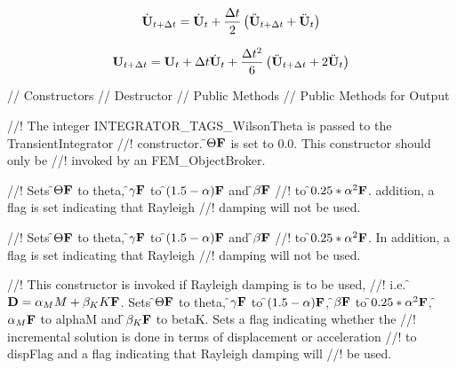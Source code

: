 \[ \dot{\bf U}_{t + \Delta t} = \dot{\bf U}_t + \frac{\Delta t}{2}\left( \ddot{\bf U}_{t +
\Delta t} + \ddot{\bf U}_t \right) \]

\[ {\bf U}_{t + \Delta t} = {\bf U}_t + \Delta t\dot{\bf U}_t + \frac{\Delta t^2}{6}\left(
\ddot{\bf U}_{t + \Delta t} + 2 \ddot{\bf U}_t \right) \]


\pagebreak
{}
\indent // Constructors
\indent // Destructor
\indent // Public Methods
\indent // Public Methods for Output

//! The integer INTEGRATOR\_TAGS\_WilsonTheta is passed to the TransientIntegrator
//! constructor. \f$\Theta{\bf F}$ is set to 0.0. This constructor should only be
//! invoked by an FEM\_ObjectBroker.



//! Sets \f$\Theta{\bf F}$ to \p theta, \f$\gamma{\bf F}$ to \f$(1.5 - \alpha){\bf F}$ and \f$\beta{\bf F}$
//! to \f$0.25*\alpha^2{\bf F}$. addition, a flag is set indicating that Rayleigh
//! damping will not be used. 

//! Sets \f$\Theta{\bf F}$ to \p theta, \f$\gamma{\bf F}$ to \f$(1.5 - \alpha){\bf F}$ and \f$\beta{\bf F}$
//! to \f$0.25*\alpha^2{\bf F}$. In addition, a flag is set indicating that Rayleigh
//! damping will not be used.

//! This constructor is invoked if Rayleigh damping is to be used, 
//! i.e. \f${\bf D} = \alpha_M M + \beta_K K{\bf F}$. Sets \f$\Theta{\bf F}$ to \p theta,
\f$\gamma{\bf F}$ to \f$(1.5 - \alpha){\bf F}$, \f$\beta{\bf F}$ to \f$0.25*\alpha^2{\bf F}$, \f$\alpha_M{\bf F}$ to
\p alphaM and \f$\beta_K{\bf F}$ to \p betaK. Sets a flag indicating whether the
//! incremental solution is done in terms of displacement or acceleration
//! to \p dispFlag and a flag indicating that Rayleigh damping will 
//! be used. 


